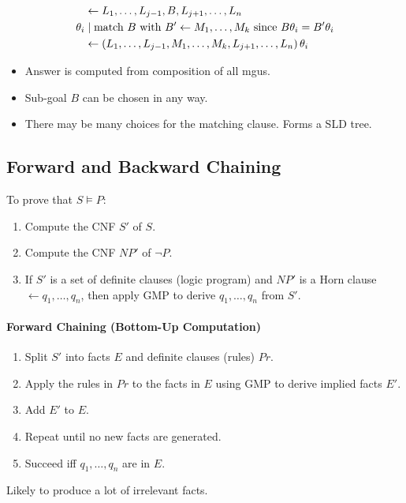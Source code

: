 \documentclass[twocolumn,english]{article}
\begin{document}
\begin{align*}
\: & \leftarrow L_{1},\dots,L_{j-1},B,L_{j+1},\dots,L_{n}\\
\theta_{i} & \mid\text{match \ensuremath{B} with \ensuremath{B'\leftarrow M_{1},\dots,M_{k}} since \ensuremath{B\theta_{i}=B'\theta_{i}}}\\
\: & \leftarrow\left(L_{1},\dots,L_{j-1},M_{1},\dots,M_{k},L_{j+1},\dots,L_{n}\right)\theta_{i}
\end{align*}
\begin{itemize}
\item Answer is computed from composition of all mgus. 
\item Sub-goal $B$ can be chosen in any way. 
\item There may be many choices for the matching clause. Forms a SLD tree. 
\end{itemize}

\subsection{Forward and Backward Chaining}

To prove that $S\vDash P$: 
\begin{enumerate}
\item Compute the CNF $S'$ of $S$. 
\item Compute the CNF $NP'$ of $\lnot P$. 
\item If $S'$ is a set of definite clauses (logic program) and $NP'$ is
a Horn clause $\leftarrow q_{1},\dots,q_{n}$, then apply GMP to derive
$q_{1},\dots,q_{n}$ from $S'$. 
\end{enumerate}

\paragraph{Forward Chaining (Bottom-Up Computation)}
\begin{enumerate}
\item Split $S'$ into facts $E$ and definite clauses (rules) $Pr$. 
\item Apply the rules in $Pr$ to the facts in $E$ using GMP to derive
implied facts $E'$. 
\item Add $E'$ to $E$. 
\item Repeat until no new facts are generated. 
\item Succeed iff $q_{1},\dots,q_{n}$ are in $E$. 
\end{enumerate}
Likely to produce a lot of irrelevant facts.
\end{document}
